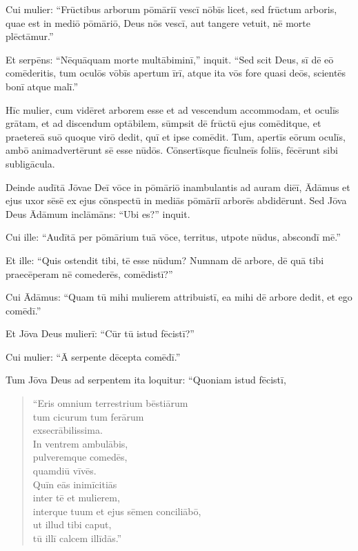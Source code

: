 \Versus Cui mulier: ``Frūctibus arborum pōmāriī vescī nōbīs licet,
\Versus sed frūctum arboris, quae est in mediō pōmāriō, Deus nōs vescī, aut tangere vetuit, nē morte plēctāmur.''

\Versus Et serpēns: ``Nēquāquam morte multābiminī,'' inquit.
\Versus ``Sed scit Deus, sī dē eō comēderitis, tum oculōs vōbīs apertum īrī, atque ita vōs fore quasi deōs, scientēs bonī atque malī.''

\Versus Hīc mulier, cum vidēret arborem esse et ad vescendum accommodam, et oculīs grātam, et ad discendum optābilem, sūmpsit dē frūctū ejus comēditque, et praetereā suō quoque virō dedit, quī et ipse comēdit.
\Versus Tum, apertīs eōrum oculīs, ambō animadvertērunt sē esse nūdōs. Cōnsertīsque fīculneīs foliīs, fēcērunt sibi subligācula.

\Versus Deinde audītā Jōvae Deī vōce in pōmāriō inambulantis ad auram diēī, Ādāmus et ejus uxor sēsē ex ejus cōnspectū in mediās pōmāriī arborēs abdidērunt.
\Versus Sed Jōva Deus Ādāmum inclāmāns: ``Ubi es?'' inquit.

\Versus Cui ille: ``Audītā per pōmārium tuā vōce, territus, utpote nūdus, abscondī mē.''

\Versus Et ille: ``Quis ostendit tibi, tē esse nūdum? Numnam dē arbore, dē quā tibi praecēperam nē comederēs, comēdistī?''

\Versus Cui Ādāmus: ``Quam tū mihi mulierem attribuistī, ea mihi dē arbore dedit, et ego comēdī.''

\Versus Et Jōva Deus mulierī: ``Cūr tū istud fēcistī?''

Cui mulier: ``Ā serpente dēcepta comēdī.''

\Versus Tum Jōva Deus ad serpentem ita loquitur: ``Quoniam istud fēcistī,

\begin{verse}
\begin{patverse*}
``Eris omnium terrestrium bēstiārum \\
 tum cicurum tum ferārum \\
 exsecrābilissima. \\
 In ventrem ambulābis, \\
 pulveremque comedēs, \\
 quamdiū vīvēs. \\
\Versus Quīn eās inimīcitiās \\
 inter tē et mulierem, \\
 interque tuum et ejus sēmen conciliābō, \\
 ut illud tibi caput, \\
 tū illī calcem illīdās.''
\end{patverse*}
\end{verse}

